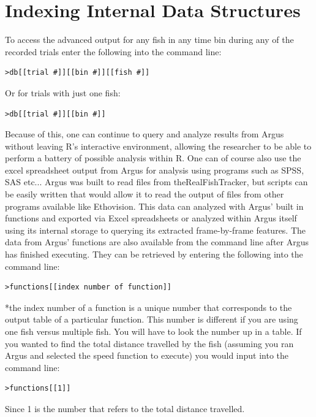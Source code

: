 \documentclass[12pt,titlepage]{report}
\begin{document}
\section{Indexing Internal Data Structures}
To access the advanced output for any fish in any time bin during any of the recorded trials enter the following into the command line:
\begin{verbatim}
>db[[trial #]][[bin #]][[fish #]]
\end{verbatim}
Or for trials with just one fish:
\begin{verbatim}
>db[[trial #]][[bin #]]
\end{verbatim}
Because of this, one can continue to query and analyze results from Argus without leaving R’s interactive environment, allowing the researcher to be able to perform a battery of possible analysis within R. One can of course also use the excel spreadsheet output from Argus for analysis using programs such as SPSS, SAS etc...
Argus was built to read files from theRealFishTracker, but scripts can be easily written that would allow it to read the output of files from other programs available like Ethovision. This data can analyzed with Argus’ built in functions and exported via Excel spreadsheets or analyzed within Argus itself using its internal storage to querying its extracted frame-by-frame features.
The data from Argus’ functions are also available from the command line after Argus has finished executing. They can be retrieved by   entering the following into the command line:
\begin{verbatim}
>functions[[index number of function]]
\end{verbatim}
*the index number of a function is a unique number that corresponds to the output table of a particular function. This number is different if you are using one fish versus multiple fish. You will have to look the number up in a table.
If you wanted to find the total distance travelled by the fish (assuming you ran Argus and selected the speed function to execute) you would input into the command line:
\begin{verbatim}
>functions[[1]]
\end{verbatim}
Since 1 is the number that refers to the total distance travelled.
\end{document}
